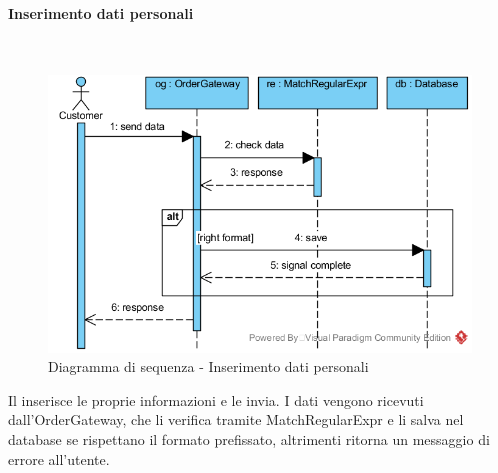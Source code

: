 \paragraph{Inserimento dati personali}\mbox{}\\
\nopagebreak
\begin{figure}[H]
	\centering
	\includegraphics[width=14cm]{diagrammi_img/sequenza/cliente_inserisci_informazioni.png}
	\caption{Diagramma di sequenza - Inserimento dati personali}
\end{figure}
Il \Customer{} inserisce le proprie informazioni e le invia. I dati vengono ricevuti dall'Order\-Gateway, che li verifica tramite MatchRegularExpr e li salva nel database se rispettano il formato prefissato, altrimenti ritorna un messaggio di errore all'utente.


